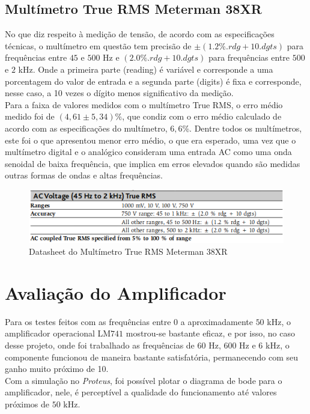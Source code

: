 \documentclass[14pt, oneside]{book}
\newcommand\tab[1][1cm]{\hspace*{#1}}
\theoremstyle{definition}
\begin{document}
                \subsection{Multímetro True RMS Meterman 38XR}
                    \tab No que diz respeito à medição de tensão, de acordo com as especificações técnicas, o multímetro em questão tem precisão de $\pm(1.2\%. rdg + 10 .dgts)$ para frequências
                    entre $45$ e $500$ Hz e $(2.0\%. rdg +10. dgts)$ para frequências entre $500$ e $2$ kHz. Onde a
                    primeira parte  (reading) é variável e corresponde a uma porcentagem do valor de entrada
                    e a segunda parte  (digits) é fixa e corresponde, nesse caso, a 10 vezes o dígito menos significativo da medição. \\
                    \tab Para a faixa de valores medidos com o multímetro True RMS, o erro médio medido foi de
                    $(4,61\pm5,34)\%$, que condiz com o erro médio calculado de acordo com as especificações do
                    multímetro, $6,6$\%. Dentre todos os multímetros, este foi o que apresentou menor erro médio,
                    o que era esperado, uma vez que o multímetro digital e o analógico consideram uma entrada
                    AC como uma onda senoidal de baixa frequência, que implica em erros elevados quando
                    são medidas outras formas de ondas e altas frequências.
                
                    \begin{figure}[H]
                        \centering
                        \includegraphics[scale = 1]{figura7.png}
                        \caption{Datasheet do Multímetro True RMS Meterman 38XR}
                        \label{fig:my_label}
                    \end{figure}
            \section{Avaliação do Amplificador}
                \tab Para os testes feitos com as frequências entre $0$ a aproximadamente $50$ kHz, o amplificador operacional LM$741$ mostrou-se bastante eficaz, e por isso, no caso desse projeto, onde foi trabalhado as frequências de $60$ Hz, $600$ Hz e $6$ kHz, o componente funcionou de maneira bastante satisfatória, permanecendo com seu ganho muito próximo de 10. \\
                \tab Com a simulação no \textit{Proteus}, foi possível plotar o diagrama de bode para o amplificador, nele, é perceptível a qualidade do funcionamento até valores próximos de $50$ kHz.
                
\end{document}
